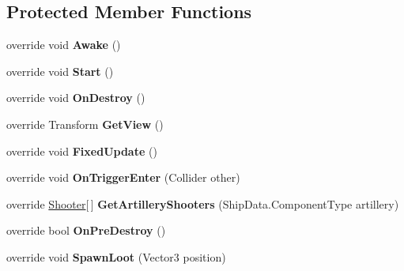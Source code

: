 \subsection*{Protected Member Functions}
\begin{DoxyCompactItemize}
\item 
\hypertarget{class_skyrates_1_1_client_1_1_entity_player_ship_a9db8469e2b7854e16ce162a6f3764faa}{override void {\bfseries Awake} ()}\label{class_skyrates_1_1_client_1_1_entity_player_ship_a9db8469e2b7854e16ce162a6f3764faa}

\item 
\hypertarget{class_skyrates_1_1_client_1_1_entity_player_ship_ad4caaf1539dcbea79dc607ef79661354}{override void {\bfseries Start} ()}\label{class_skyrates_1_1_client_1_1_entity_player_ship_ad4caaf1539dcbea79dc607ef79661354}

\item 
\hypertarget{class_skyrates_1_1_client_1_1_entity_player_ship_ad0f601ebd540f2fbab01f3e9daa3839f}{override void {\bfseries On\-Destroy} ()}\label{class_skyrates_1_1_client_1_1_entity_player_ship_ad0f601ebd540f2fbab01f3e9daa3839f}

\item 
\hypertarget{class_skyrates_1_1_client_1_1_entity_player_ship_a6f8eabb948e3acf794bd6c230980b0e3}{override Transform {\bfseries Get\-View} ()}\label{class_skyrates_1_1_client_1_1_entity_player_ship_a6f8eabb948e3acf794bd6c230980b0e3}

\item 
\hypertarget{class_skyrates_1_1_client_1_1_entity_player_ship_a998fa020992060cd89761997097ae686}{override void {\bfseries Fixed\-Update} ()}\label{class_skyrates_1_1_client_1_1_entity_player_ship_a998fa020992060cd89761997097ae686}

\item 
\hypertarget{class_skyrates_1_1_client_1_1_entity_player_ship_a8eb84bd75cd1d5ebae5871f5eb75befe}{override void {\bfseries On\-Trigger\-Enter} (Collider other)}\label{class_skyrates_1_1_client_1_1_entity_player_ship_a8eb84bd75cd1d5ebae5871f5eb75befe}

\item 
\hypertarget{class_skyrates_1_1_client_1_1_entity_player_ship_a4412fddf4c2ce10e33bc551c55b06812}{override \hyperlink{class_shooter}{Shooter}\mbox{[}$\,$\mbox{]} {\bfseries Get\-Artillery\-Shooters} (Ship\-Data.\-Component\-Type artillery)}\label{class_skyrates_1_1_client_1_1_entity_player_ship_a4412fddf4c2ce10e33bc551c55b06812}

\item 
\hypertarget{class_skyrates_1_1_client_1_1_entity_player_ship_a5b498069e7b4da208115f2e560fe6383}{override bool {\bfseries On\-Pre\-Destroy} ()}\label{class_skyrates_1_1_client_1_1_entity_player_ship_a5b498069e7b4da208115f2e560fe6383}

\item 
\hypertarget{class_skyrates_1_1_client_1_1_entity_player_ship_af4fafbed973c7222d02e1df485d9ad73}{override void {\bfseries Spawn\-Loot} (Vector3 position)}\label{class_skyrates_1_1_client_1_1_entity_player_ship_af4fafbed973c7222d02e1df485d9ad73}

\end{DoxyCompactItemize}
